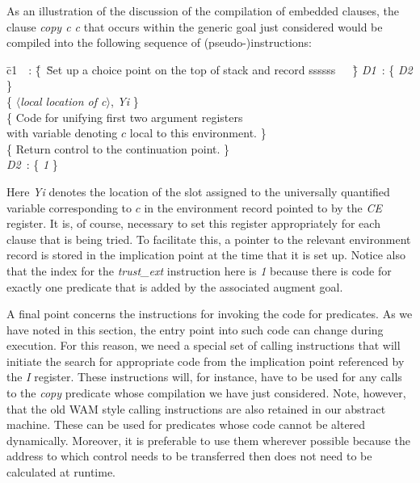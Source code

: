 As an illustration of the discussion of the compilation of embedded
clauses, the clause {\it copy c c} that occurs within the generic goal
just considered would be compiled into the following sequence of
(pseudo-)instructions:
\begin{tabbing}
\quad\= c1\ \ : \=\{\ \=Set up a choice point on the top of stack and record ssssss\ \ \ \=\}\kill
\> {\it D1}\ :  \>\{  {\it D2}                                            \>\} \\
\>              \>\{  $\langle${\it local location of
c}$\rangle$, {\it Yi} \>\} \\
\>              \>\{ \>Code for unifying first two argument registers \\
\>              \>   \> with variable denoting $c$ local to this environment.                                      \>\} \\
\>              \>\{ \>Return control to the continuation point.  \>\} \\
\> {\it D2}\ :  \>\{  {\it 1}                                             \>\}

\end{tabbing}
Here {\it Yi} denotes the location of the slot assigned to the
universally quantified variable corresponding to $c$ in the
environment record pointed to by the {\it CE} register. It is, of
course, necessary to set this register appropriately for each clause
that is being tried. To facilitate this, a pointer to the relevant
environment record is stored in the implication point at the time that
it is set up. Notice also that the index for the {\it trust\_ext}
instruction here is {\it 1} because there is code for exactly one
predicate that is added by the associated augment goal.


A final point concerns the instructions for invoking the code
for predicates. As we have noted in this section, the entry
point into such code can change during execution. For this reason, we
need a special set of calling instructions that will
initiate the search for appropriate code from the implication point
referenced by the {\it I} register. These instructions will,
for instance, have to be used for any calls to the {\it copy}
predicate whose compilation we have just considered.
Note, however, that the old WAM style calling instructions are also
retained in our abstract machine. These can be used for predicates
whose code cannot be altered dynamically. Moreover, it is preferable
to use them wherever possible because the address to which control
needs to be transferred then does not need to be calculated at
runtime.

